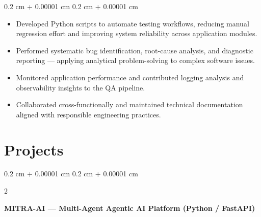 \documentclass[10pt, letterpaper]{article}
\newenvironment{highlights}{
    \begin{itemize}[
        topsep=0.10 cm,
        parsep=0.10 cm,
        partopsep=0pt,
        itemsep=0pt,
        leftmargin=0.4 cm + 10pt
    ]
}{
    \end{itemize}
}
\newenvironment{onecolentry}{
    \begin{adjustwidth}{
        0.2 cm + 0.00001 cm
    }{
        0.2 cm + 0.00001 cm
    }
}{
    \end{adjustwidth}
}
\newenvironment{twocolentry}[2][]{
    \onecolentry
    \def\secondColumn{#2}
    \setcolumnwidth{\fill, 4.5 cm}
    \begin{paracol}{2}
}{
    \switchcolumn \raggedleft \secondColumn
    \end{paracol}
    \endonecolentry
}
\let\hrefWithoutArrow\href
\renewcommand{\href}[2]{\hrefWithoutArrow{#1}{\ifthenelse{\equal{#2}{}}{ }{#2 }\raisebox{.15ex}{\footnotesize \faExternalLink*}}}
\begin{document}
        \vspace{0.10 cm}
        \begin{onecolentry}
            \begin{highlights}
                \item Developed Python scripts to automate testing workflows, reducing manual regression effort and improving system reliability across application modules.
                \item Performed systematic bug identification, root-cause analysis, and diagnostic reporting — applying analytical problem-solving to complex software issues.
                \item Monitored application performance and contributed logging analysis and observability insights to the QA pipeline.
                \item Collaborated cross-functionally and maintained technical documentation aligned with responsible engineering practices.
            \end{highlights}
        \end{onecolentry}

        \vspace{0.20 cm}

    


    \section{Projects}

        \begin{twocolentry}{
            \textit{\href{https://GitHub.com/MITRA0616/Application.git}{MITRA-AI}}}
            \textbf{MITRA-AI — Multi-Agent Agentic AI Platform (Python / FastAPI)}
        \end{twocolentry}
\end{document}
